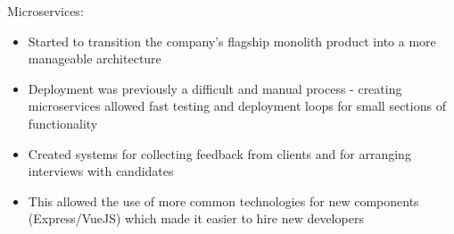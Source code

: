 \item Microservices:
\begin{itemize}%
    \item Started to transition the company's flagship monolith product into a more manageable architecture
    \item Deployment was previously a difficult and manual process - creating microservices allowed fast testing and deployment loops for small sections of functionality
    \item Created systems for collecting feedback from clients and for arranging interviews with candidates
    \item This allowed the use of more common technologies for new components (Express/VueJS) which made it easier to hire new developers
\end{itemize}
